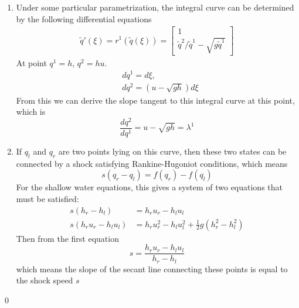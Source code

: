 \documentclass[11pt]{article}
\begin{document}
\begin{enumerate}
        	\begin{enumerate}
        		\item
        			Under some particular parametrization, the integral curve can be determined by the following differential equations
        			\begin{align*}
        			\tilde{q}'(\xi)=r^1(\tilde{q}(\xi))=\begin{bmatrix}1\\ \tilde{q}^2/\tilde{q}^1-\sqrt{g\tilde{q}^1}\end{bmatrix}
        			\end{align*}
        			At point $q^1=h$, $q^2=hu$.
        			\begin{align*}
        			&dq^1=d\xi,\\
        			&dq^2=(u-\sqrt{gh})d\xi
        			\end{align*}
        			From this we can derive the slope tangent to this integral curve at this point, which is 
        			\[
        			\frac{dq^2}{dq^1}=u-\sqrt{gh}=\lambda^1
        			\]
        		\item
        			If $q_l$ and $q_r$ are two points lying on this curve, then these two states can be connected by a shock satisfying Rankine-Hugoniot conditions, which means 
        			\[
        			s(q_r-q_l)=f(q_r)-f(q_l)
        			\]
        			For the shallow water equations, this gives a system of two equations that must be satisfied:
        			\begin{align*}
        			s(h_r-h_l)&=h_ru_r-h_lu_l\\
        			s(h_ru_r-h_lu_l)&=h_ru_r^2-h_lu_l^2+\frac{1}{2}g(h_r^2-h_l^2)
        			\end{align*}
        			Then from the first equation
        			\[
        			s=\frac{h_ru_r-h_lu_l}{h_r-h_l}
        			\]
        			which means the slope of the secant line connecting these points is equal to the shock speed $s$
        	\end{enumerate}
\qed
\newpage  


\end{enumerate}
\end{document}
